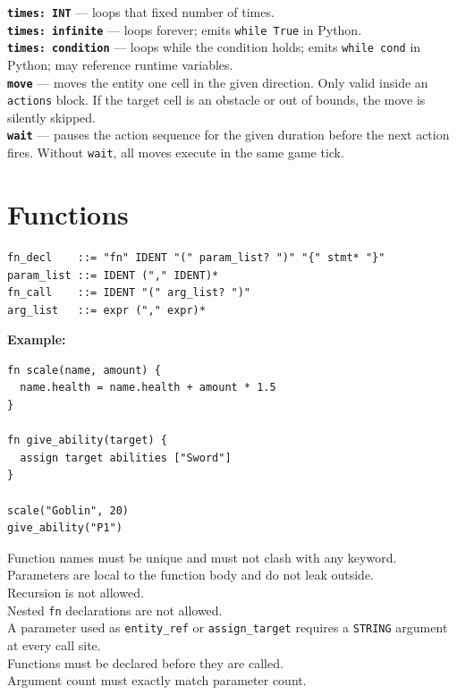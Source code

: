 \documentclass[12pt,a4paper]{article}
\begin{document}
\begin{cbox}
\textbf{\texttt{times: INT}} --- loops that fixed number of times.\\
\textbf{\texttt{times: infinite}} --- loops forever; emits \texttt{while True} in Python.\\
\textbf{\texttt{times: condition}} --- loops while the condition holds; emits \texttt{while cond} in Python; may reference runtime variables.\\[4pt]
\textbf{\texttt{move}} --- moves the entity one cell in the given direction. Only valid inside an \texttt{actions} block. If the target cell is an obstacle or out of bounds, the move is silently skipped.\\
\textbf{\texttt{wait}} --- pauses the action sequence for the given duration before the next action fires. Without \texttt{wait}, all moves execute in the same game tick.
\end{cbox}

\section{Functions}

\begin{lstlisting}[style=bnf]
fn_decl    ::= "fn" IDENT "(" param_list? ")" "{" stmt* "}"
param_list ::= IDENT ("," IDENT)*
fn_call    ::= IDENT "(" arg_list? ")"
arg_list   ::= expr ("," expr)*
\end{lstlisting}

\textbf{Example:}
\begin{lstlisting}[style=dsl]
fn scale(name, amount) {
  name.health = name.health + amount * 1.5
}

fn give_ability(target) {
  assign target abilities ["Sword"]
}

scale("Goblin", 20)
give_ability("P1")
\end{lstlisting}

\begin{cbox}
Function names must be unique and must not clash with any keyword.\\
Parameters are local to the function body and do not leak outside.\\
Recursion is not allowed.\\
Nested \texttt{fn} declarations are not allowed.\\
A parameter used as \texttt{entity\_ref} or \texttt{assign\_target}
requires a \texttt{STRING} argument at every call site.\\
Functions must be declared before they are called.\\
Argument count must exactly match parameter count.
\end{cbox}
\end{document}
